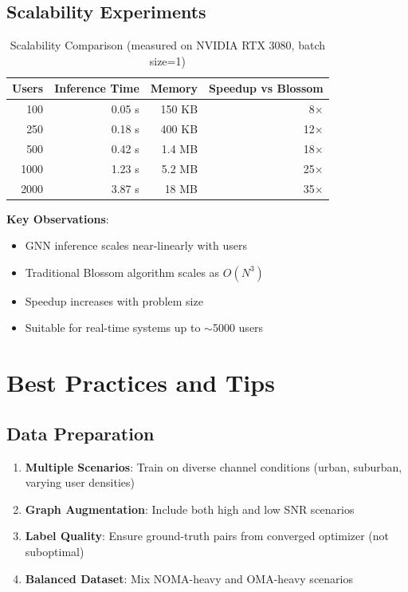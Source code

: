 \documentclass[12pt,a4paper]{article}
\begin{document}
\subsection{Scalability Experiments}

\begin{table}[H]
\centering
\begin{tabular}{@{}rrrr@{}}
\toprule
\textbf{Users} & \textbf{Inference Time} & \textbf{Memory} & \textbf{Speedup vs Blossom} \\
\midrule
100 & 0.05 s & 150 KB & 8× \\
250 & 0.18 s & 400 KB & 12× \\
500 & 0.42 s & 1.4 MB & 18× \\
1000 & 1.23 s & 5.2 MB & 25× \\
2000 & 3.87 s & 18 MB & 35× \\
\bottomrule
\end{tabular}
\caption{Scalability Comparison (measured on NVIDIA RTX 3080, batch size=1)}
\end{table}

\textbf{Key Observations}:
\begin{itemize}
    \item GNN inference scales near-linearly with users
    \item Traditional Blossom algorithm scales as $O(N^3)$
    \item Speedup increases with problem size
    \item Suitable for real-time systems up to $\sim$5000 users
\end{itemize}

\section{Best Practices and Tips}

\subsection{Data Preparation}

\begin{enumerate}
    \item \textbf{Multiple Scenarios}: Train on diverse channel conditions (urban, suburban, varying user densities)
    \item \textbf{Graph Augmentation}: Include both high and low SNR scenarios
    \item \textbf{Label Quality}: Ensure ground-truth pairs from converged optimizer (not suboptimal)
    \item \textbf{Balanced Dataset}: Mix NOMA-heavy and OMA-heavy scenarios
\end{enumerate}
\end{document}
